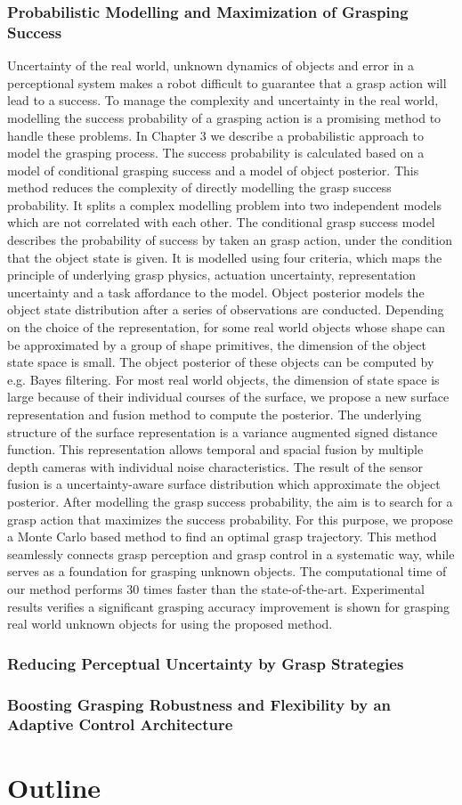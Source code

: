 \subsubsection{Probabilistic Modelling and Maximization of Grasping Success}
Uncertainty of the real world, unknown dynamics of objects and error in a perceptional system makes a robot difficult to guarantee that a grasp action will lead to a success. To manage the complexity and uncertainty in the real world, modelling the success probability of a grasping action is a promising method to handle these problems. In Chapter 3 we describe a probabilistic approach to model the grasping process. The success probability is calculated based on a model of conditional grasping success and a model of object posterior. This method reduces the complexity of directly modelling the grasp success probability. It splits a complex modelling problem into two independent models which are not correlated with each other. The conditional grasp success model describes the probability of success by taken an grasp action, under the condition that the object state is given. It is modelled using four criteria, which maps the principle of underlying grasp physics, actuation uncertainty, representation uncertainty and a task  affordance to the model. Object posterior models the object state distribution after a series of observations are conducted. Depending on the choice of the representation, for some real world objects whose shape can be approximated by a group of shape primitives, the dimension of the object state space is small. The object posterior of these objects can be computed by e.g. Bayes filtering. For most real  world objects, the dimension of state space is large because of their individual courses of the surface, we propose a new surface representation and fusion method to compute the posterior. The underlying structure of the surface representation is a variance augmented signed distance function. This representation allows temporal and spacial fusion by multiple depth cameras with  individual noise characteristics. The result of the sensor fusion is a uncertainty-aware surface distribution which approximate the object posterior. After modelling the grasp success probability, the aim  is to search for a grasp action that maximizes the success probability. For this purpose, we propose a Monte Carlo based method to find an optimal grasp trajectory. This method seamlessly connects grasp perception and grasp control in a systematic way, while serves as a foundation for grasping unknown objects. The computational time of our method performs 30 times faster than the state-of-the-art. Experimental results verifies a significant grasping accuracy improvement is shown for grasping real world unknown objects for using the proposed method. 


\subsubsection{Reducing Perceptual Uncertainty by Grasp Strategies}
 



\subsubsection{Boosting Grasping Robustness and Flexibility by an Adaptive Control Architecture}


\section{Outline}


